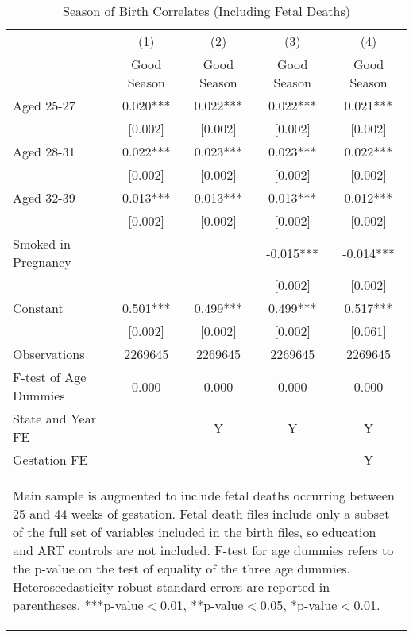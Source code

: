 \documentclass[a4paper, 12 pt]{article}
\theoremstyle{plain}
\begin{document}
\begin{doublespace}
\begin{table}[htbp]\centering
\def\sym#1{\ifmmode^{#1}\else\(^{#1}\)\fi}
\caption{Season of Birth Correlates (Including Fetal Deaths) \label{tab:FDeaths}}
\begin{tabular}{l*{4}{c}}
\toprule
                    &\multicolumn{1}{c}{(1)}   &\multicolumn{1}{c}{(2)}   &\multicolumn{1}{c}{(3)}   &\multicolumn{1}{c}{(4)}   \\
                    & Good Season   & Good Season   & Good Season   & Good Season   \\
\midrule
Aged 25-27          &       0.020***&       0.022***&       0.022***&       0.021***\\
                    &     [0.002]   &     [0.002]   &     [0.002]   &     [0.002]   \\
Aged 28-31          &       0.022***&       0.023***&       0.023***&       0.022***\\
                    &     [0.002]   &     [0.002]   &     [0.002]   &     [0.002]   \\
Aged 32-39          &       0.013***&       0.013***&       0.013***&       0.012***\\
                    &     [0.002]   &     [0.002]   &     [0.002]   &     [0.002]   \\
Smoked in Pregnancy &               &               &      -0.015***&      -0.014***\\
                    &               &               &     [0.002]   &     [0.002]   \\
Constant            &       0.501***&       0.499***&       0.499***&       0.517***\\
                    &     [0.002]   &     [0.002]   &     [0.002]   &     [0.061]   \\
\midrule
Observations        &     2269645   &     2269645   &     2269645   &     2269645   \\
F-test of Age Dummies&0.000&0.000&0.000&0.000 \\
State and Year FE&&Y&Y&Y\\  Gestation FE &&&&Y \\ \bottomrule
\multicolumn{5}{p{14 cm}}{\begin{footnotesize} Main sample is
augmented to include fetal deaths occurring between 25 and 44
weeks of gestation. Fetal death files
include only a subset of the full set of variables included in the
birth files, so education and ART controls are not included. F-test
for age dummies refers to the p-value on the test of equality of
the three age dummies. Heteroscedasticity robust standard errors
are reported in parentheses.
***p-value$<$0.01, **p-value$<$0.05, *p-value$<$0.01.
\end{footnotesize}}\end{tabular}\end{table}



\end{doublespace}
\end{document}
